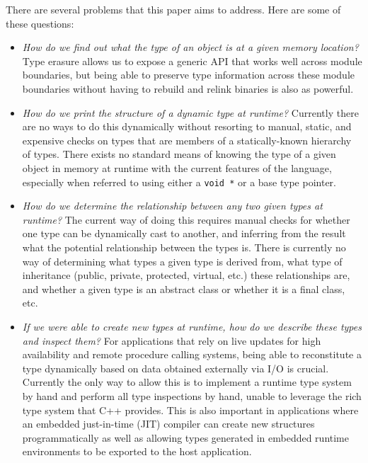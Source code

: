 \documentclass[10pt,a4paper]{article}
\begin{document}
There are several problems that this paper aims to address. Here are some of
these questions:

\begin{itemize}
\item \emph{How do we find out what the type of an object is at a given memory
location?}  Type erasure allows us to expose a generic API that works well
across module boundaries, but being able to preserve type information across
these module boundaries without having to rebuild and relink binaries is also as
powerful.

\item \emph{How do we print the structure of a dynamic type at runtime?}
Currently there are no ways to do this dynamically without resorting to manual,
static, and expensive checks on types that are members of a statically-known
hierarchy of types. There exists no standard means of knowing the type of a
given object in memory at runtime with the current features of the language,
especially when referred to using either a \verb+void *+ or a base type pointer.

\item \emph{How do we determine the relationship between any two given types at
runtime?} The current way of doing this requires manual checks for whether one
type can be dynamically cast to another, and inferring from the result what the
potential relationship between the types is. There is currently no way of
determining what types a given type is derived from, what type of inheritance
(public, private, protected, virtual, etc.) these relationships are, and whether
a given type is an abstract class or whether it is a final class, etc.

\item \emph{If we were able to create new types at runtime, how do we describe
these types and inspect them?} For applications that rely on live updates for
high availability and remote procedure calling systems, being able to
reconstitute a type dynamically based on data obtained externally via I/O is
crucial. Currently the only way to allow this is to implement a runtime type
system by hand and perform all type inspections by hand, unable to leverage the
rich type system that C++ provides. This is also important in applications where
an embedded just-in-time (JIT) compiler can create new structures
programmatically as well as allowing types generated in embedded runtime
environments to be exported to the host application.
\end{itemize}
\end{document}
